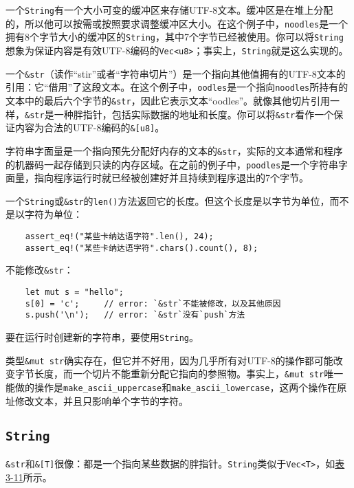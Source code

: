 一个\texttt{String}有一个大小可变的缓冲区来存储UTF-8文本。缓冲区是在堆上分配的，所以他可以按需或按照要求调整缓冲区大小。在这个例子中，\texttt{noodles}是一个拥有8个字节大小的缓冲区的\texttt{String}，其中7个字节已经被使用。你可以将\texttt{String}想象为保证内容是有效UTF-8编码的\texttt{Vec<u8>}；事实上，\texttt{String}就是这么实现的。

一个\texttt{\&str}（读作“stir”或者“字符串切片”）是一个指向其他值拥有的UTF-8文本的引用：它“借用”了这段文本。在这个例子中，\texttt{oodles}是一个指向\texttt{noodles}所持有的文本中的最后六个字节的\texttt{\&str}，因此它表示文本“oodles”。就像其他切片引用一样，\texttt{\&str}是一种胖指针，包括实际数据的地址和长度。你可以将\texttt{\&str}看作一个保证内容为合法的UTF-8编码的\texttt{\&[u8]}。

字符串字面量是一个指向预先分配好内存的文本的\texttt{\&str}，实际的文本通常和程序的机器码一起存储到只读的内存区域。在之前的例子中，\texttt{poodles}是一个字符串字面量，指向程序运行时就已经被创建好并且持续到程序退出的7个字节。

一个\texttt{String}或\texttt{\&str}的\texttt{len()}方法返回它的长度。但这个长度是以字节为单位，而不是以字符为单位：
\begin{verbatim}
    assert_eq!("某些卡纳达语字符".len(), 24);
    assert_eq!("某些卡纳达语字符".chars().count(), 8);
\end{verbatim}

不能修改\texttt{\&str}：
\begin{verbatim}
    let mut s = "hello";
    s[0] = 'c';     // error: `&str`不能被修改，以及其他原因
    s.push('\n');   // error: `&str`没有`push`方法
\end{verbatim}

要在运行时创建新的字符串，要使用\texttt{String}。

类型\texttt{\&mut str}确实存在，但它并不好用，因为几乎所有对UTF-8的操作都可能改变字节长度，而一个切片不能重新分配它指向的参照物。事实上，\texttt{\&mut str}唯一能做的操作是\texttt{make\_ascii\_uppercase}和\texttt{make\_ascii\_lowercase}，这两个操作在原址修改文本，并且只影响单个字节的字符。

\subsection{\texttt{String}}
\texttt{\&str}和\texttt{\&[T]}很像：都是一个指向某些数据的胖指针。\texttt{String}类似于\texttt{Vec<T>}，如\hyperref[t3-11]{表3-11}所示。


